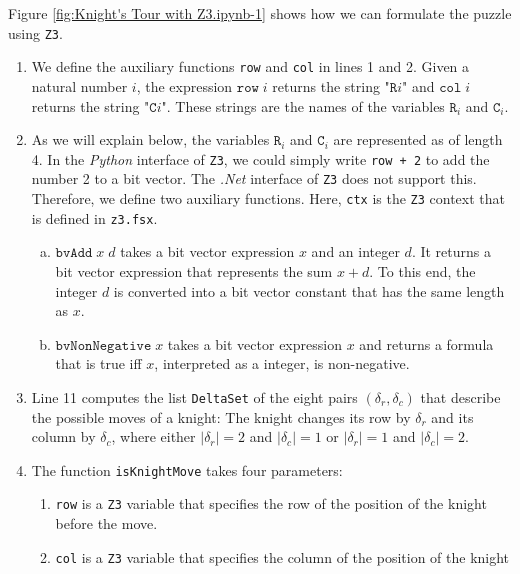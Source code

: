 Figure \ref{fig:Knight's Tour with Z3.ipynb-1} shows how we can formulate the puzzle using \texttt{Z3}.
\begin{enumerate}
\item We define the auxiliary functions \texttt{row} and \texttt{col} in lines 1 and 2.
      Given a natural number $i$, the expression $\mathtt{row}\;i$ returns the string $\texttt{"R}i\texttt{"}$
      and  $\mathtt{col}\;i$ returns the string  $\texttt{"C}i\texttt{"}$.  These strings are the names of the
      variables $\mathtt{R}_i$ and $\mathtt{C}_i$.
\item As we will explain below, the variables $\mathtt{R}_i$ and $\mathtt{C}_i$ are represented as
       of length 4.  In the \textsl{Python} interface of \texttt{Z3}, we could simply write
      \texttt{row + 2} to add the number 2 to a bit vector.  The \textsl{.Net} interface of \texttt{Z3} does not
      support this.  Therefore, we define two auxiliary functions.  Here, \texttt{ctx} is the \texttt{Z3}
      context that is defined in \texttt{z3.fsx}.
      \begin{enumerate}[(a)]
      \item $\mathtt{bvAdd}\;x\;d$ takes a bit vector expression $x$ and an integer $d$.  It returns a
            bit vector expression that represents the sum $x + d$.  To this end, the integer $d$ is converted into a
            bit vector constant that has the same length as $x$.
      \item $\mathtt{bvNonNegative}\;x$ takes a bit vector expression $x$ and returns a formula that is true
            iff $x$, interpreted as a  integer, is non-negative.
      \end{enumerate}
\item Line 11 computes the list \texttt{DeltaSet} of the eight pairs $(\delta_r, \delta_c)$ that describe the
      possible moves of a knight:  The knight changes its row by $\delta_r$ and its column by $\delta_c$, where
      either $|\delta_r| = 2$ and $|\delta_c| = 1$ or $|\delta_r| = 1$ and $|\delta_c| = 2$.
\item The function \texttt{isKnightMove} takes four parameters:
      \begin{enumerate}
      \item \texttt{row} is a \texttt{Z3} variable that specifies the row of the position of the knight before
            the move. 
      \item \texttt{col} is a \texttt{Z3} variable that specifies the column of the position of the knight

\end{enumerate}
\end{enumerate}
